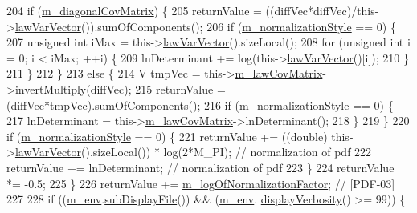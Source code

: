 \begin{DoxyCode}
204     \textcolor{keywordflow}{if} (\hyperlink{class_q_u_e_s_o_1_1_gaussian_joint_pdf_a7e18c86c60bd7dc4ceaadaab618c3241}{m\_diagonalCovMatrix}) \{
205       returnValue = ((diffVec*diffVec)/this->\hyperlink{class_q_u_e_s_o_1_1_gaussian_joint_pdf_ae7af4530bc9394393f3383b6321bc839}{lawVarVector}()).sumOfComponents();
206       \textcolor{keywordflow}{if} (\hyperlink{class_q_u_e_s_o_1_1_base_joint_pdf_a138c99bcef7a67077d9612bddfdcb896}{m\_normalizationStyle} == 0) \{
207         \textcolor{keywordtype}{unsigned} \textcolor{keywordtype}{int} iMax = this->\hyperlink{class_q_u_e_s_o_1_1_gaussian_joint_pdf_ae7af4530bc9394393f3383b6321bc839}{lawVarVector}().sizeLocal();
208         \textcolor{keywordflow}{for} (\textcolor{keywordtype}{unsigned} \textcolor{keywordtype}{int} i = 0; i < iMax; ++i) \{
209           lnDeterminant += log(this->\hyperlink{class_q_u_e_s_o_1_1_gaussian_joint_pdf_ae7af4530bc9394393f3383b6321bc839}{lawVarVector}()[i]);
210         \}
211       \}
212     \}
213     \textcolor{keywordflow}{else} \{
214       V tmpVec = this->\hyperlink{class_q_u_e_s_o_1_1_gaussian_joint_pdf_af13b72027783d8db03721951a71087d8}{m\_lawCovMatrix}->invertMultiply(diffVec);
215       returnValue = (diffVec*tmpVec).sumOfComponents();
216       \textcolor{keywordflow}{if} (\hyperlink{class_q_u_e_s_o_1_1_base_joint_pdf_a138c99bcef7a67077d9612bddfdcb896}{m\_normalizationStyle} == 0) \{
217         lnDeterminant = this->\hyperlink{class_q_u_e_s_o_1_1_gaussian_joint_pdf_af13b72027783d8db03721951a71087d8}{m\_lawCovMatrix}->lnDeterminant();
218       \}
219     \}
220     \textcolor{keywordflow}{if} (\hyperlink{class_q_u_e_s_o_1_1_base_joint_pdf_a138c99bcef7a67077d9612bddfdcb896}{m\_normalizationStyle} == 0) \{
221       returnValue += ((double) this->\hyperlink{class_q_u_e_s_o_1_1_gaussian_joint_pdf_ae7af4530bc9394393f3383b6321bc839}{lawVarVector}().sizeLocal()) * log(2*M\_PI);   \textcolor{comment}{//
       normalization of pdf}
222       returnValue += lnDeterminant; \textcolor{comment}{// normalization of pdf}
223     \}
224     returnValue *= -0.5;
225   \}
226   returnValue += \hyperlink{class_q_u_e_s_o_1_1_base_joint_pdf_ae82d4191f17af8c7a26226d127bc7850}{m\_logOfNormalizationFactor}; \textcolor{comment}{// [PDF-03]}
227 
228   \textcolor{keywordflow}{if} ((\hyperlink{class_q_u_e_s_o_1_1_base_scalar_function_adf44141aeb765d97613286f88f235f04}{m\_env}.\hyperlink{class_q_u_e_s_o_1_1_base_environment_a8a0064746ae8dddfece4229b9ad374d6}{subDisplayFile}()) && (\hyperlink{class_q_u_e_s_o_1_1_base_scalar_function_adf44141aeb765d97613286f88f235f04}{m\_env}.
      \hyperlink{class_q_u_e_s_o_1_1_base_environment_a1fe5f244fc0316a0ab3e37463f108b96}{displayVerbosity}() >= 99)) \{

\end{DoxyCode}
